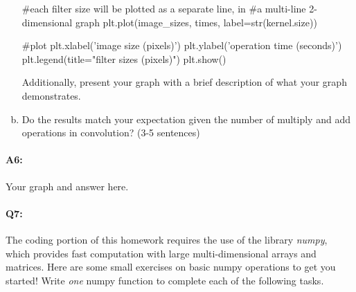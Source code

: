 \begin{enumerate}[(a)]
\begin{python}
    #each filter size will be plotted as a separate line, in
    #a multi-line 2-dimensional graph
    plt.plot(image_sizes, times, label=str(kernel.size))

#plot
plt.xlabel('image size (pixels)')
plt.ylabel('operation time (seconds)')
plt.legend(title="filter sizes (pixels)")
plt.show()

\end{python}

    Additionally, present your graph with a brief description of what your graph demonstrates.

\item
    Do the results match your expectation given the number of multiply and add operations in convolution? (3-5 sentences)
\end{enumerate}

\pagebreak
\paragraph{A6:} Your graph and answer here.





\pagebreak
\paragraph{Q7:} The coding portion of this homework requires the use of the library \emph{numpy}, which provides fast computation with large multi-dimensional arrays and matrices. Here are some small exercises on basic numpy operations to get you started! Write \emph{one} numpy function to complete each of the following tasks.

